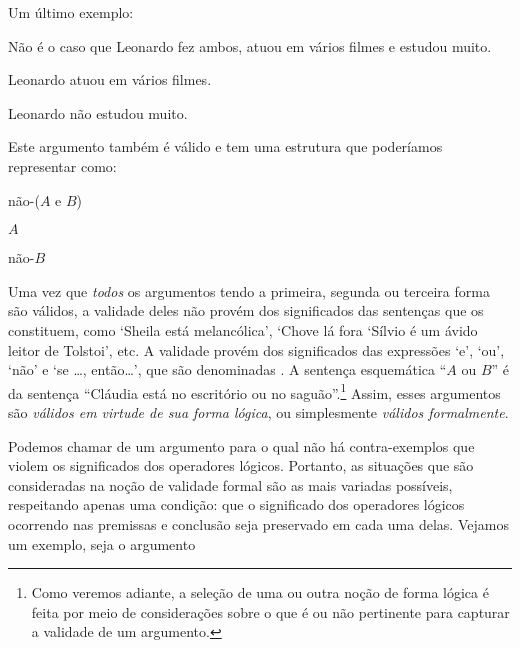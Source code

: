 Um último exemplo:
	\begin{earg}
		\item[] Não é o caso que Leonardo fez ambos, atuou em vários filmes e estudou muito.
		\item[] Leonardo atuou em vários filmes.
		\item[\therefore] Leonardo não estudou muito.
	\end{earg}
Este argumento também é válido e tem uma estrutura que poderíamos representar como:
	\begin{earg}
		\item[] não-($A$ e $B$)
		\item[] $A$
		\item[\therefore] não-$B$
	\end{earg}
Uma vez que \emph{todos} os argumentos tendo a primeira, segunda ou terceira forma são válidos, a validade deles não provém dos significados das sentenças que os constituem, como `Sheila está melancólica', `Chove lá fora `Sílvio é um ávido leitor de Tolstoi', etc.
A validade provém dos significados das expressões  `e', `ou', `não' e `se \ldots, então\ldots', que  são denominadas . 
A sentença esquemática ``$A$ ou $B$'' é  da sentença ``Cláudia está no escritório ou no saguão''.\footnote{Como veremos adiante, a seleção de uma ou outra noção de forma lógica é feita por meio de considerações sobre o que é ou não pertinente para capturar a validade de um argumento.}
Assim, esses argumentos são \emph{válidos em virtude de sua forma lógica}, ou simplesmente \emph{válidos formalmente}. 

Podemos chamar de  um argumento para o qual não há contra-exemplos que violem os significados dos operadores lógicos.
Portanto, as situações que são consideradas na noção de validade formal são as mais variadas possíveis, respeitando apenas uma condição: que o significado dos operadores lógicos ocorrendo nas premissas e conclusão seja preservado em cada uma delas. 
Vejamos um exemplo, seja o argumento 

